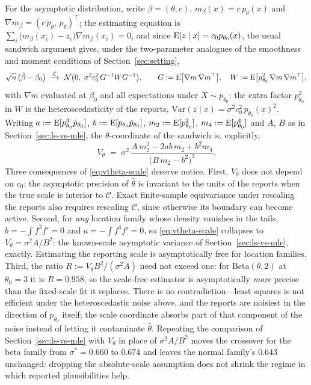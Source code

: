 For the asymptotic distribution, write $\beta=(\theta,c)$, $m_{\beta}(x)=c\,p_{\theta}(x)$ and $\nabla m_{\beta}=(c\,\dot p_{\theta},\,p_{\theta})^{\top}$; the estimating equation is $\sum_i\big(m_{\beta}(x_i)-z_i\big)\nabla m_{\beta}(x_i)=0$, and since $\mathrm{E}[z\mid x]=c_{0}p_{\theta_{0}}(x)$, the usual sandwich argument gives, under the two-parameter analogues of the smoothness and moment conditions of Section~\ref{sec:setting},
\[
\sqrt{n}\,\big(\hat\beta-\beta_{0}\big)\ \xrightarrow{\mathcal{L}}\ \mathcal{N}\big(0,\ \sigma^{2}c_{0}^{2}\,G^{-1}WG^{-1}\big),
\qquad
G:=\E\big[\nabla m\,\nabla m^{\top}\big],\quad
W:=\E\big[p_{\theta_{0}}^{2}\,\nabla m\,\nabla m^{\top}\big],
\]
with $\nabla m$ evaluated at $\beta_{0}$ and all expectations under $X\sim p_{\theta_{0}}$; the extra factor $p_{\theta_{0}}^{2}$ in $W$ is the heteroscedasticity of the reports, $\mathrm{Var}(z\mid x)=\sigma^{2}c_{0}^{2}\,p_{\theta_{0}}(x)^{2}$. Writing $a:=\mathrm{E}[p_{\theta_{0}}^{3}\dot p_{\theta_{0}}]$, $b:=\mathrm{E}[p_{\theta_{0}}\dot p_{\theta_{0}}]$, $m_{2}:=\mathrm{E}[p_{\theta_{0}}^{2}]$, $m_{4}:=\mathrm{E}[p_{\theta_{0}}^{4}]$ and $A$, $B$ as in Section~\ref{sec:ls-vs-mle}, the $\theta$-coordinate of the sandwich is, explicitly,
\begin{equation}\label{eq:vtheta-scale}
V_{\theta}\;=\;\sigma^{2}\,\frac{A\,m_{2}^{2}-2ab\,m_{2}+b^{2}m_{4}}{\big(B\,m_{2}-b^{2}\big)^{2}} .
\end{equation}
Three consequences of \eqref{eq:vtheta-scale} deserve notice. First, $V_{\theta}$ does not depend on $c_{0}$: the asymptotic precision of $\hat\theta$ is invariant to the units of the reports when the true scale is interior to $\mathcal{C}$. Exact finite-sample equivariance under rescaling the reports also requires rescaling $\mathcal{C}$, since otherwise its boundary can become active. Second, for \emph{any} location family whose density vanishes in the tails, $b=-\int f^{2}f'=0$ and $a=-\int f^{4}f'=0$, so \eqref{eq:vtheta-scale} collapses to $V_{\theta}=\sigma^{2}A/B^{2}$: the known-scale asymptotic variance of Section~\ref{sec:ls-vs-mle}, exactly. Estimating the reporting scale is asymptotically free for location families. Third, the ratio $R:=V_{\theta}B^{2}/(\sigma^{2}A)$ need not exceed one: for $\mathrm{Beta}(\theta,2)$ at $\theta_{0}=3$ it is $R=0.958$, so the scale-free estimator is asymptotically \emph{more} precise than the fixed-scale fit it replaces. There is no contradiction---least squares is not efficient under the heteroscedastic noise above, and the reports are noisiest in the direction of $p_{\theta_{0}}$ itself; the scale coordinate absorbs part of that component of the noise instead of letting it contaminate $\hat\theta$. Repeating the comparison of Section~\ref{sec:ls-vs-mle} with $V_{\theta}$ in place of $\sigma^{2}A/B^{2}$ moves the crossover for the beta family from $\sigma^{\ast}=0.660$ to $0.674$ and leaves the normal family's $0.643$ unchanged: dropping the absolute-scale assumption does not shrink the regime in which reported plausibilities help.

